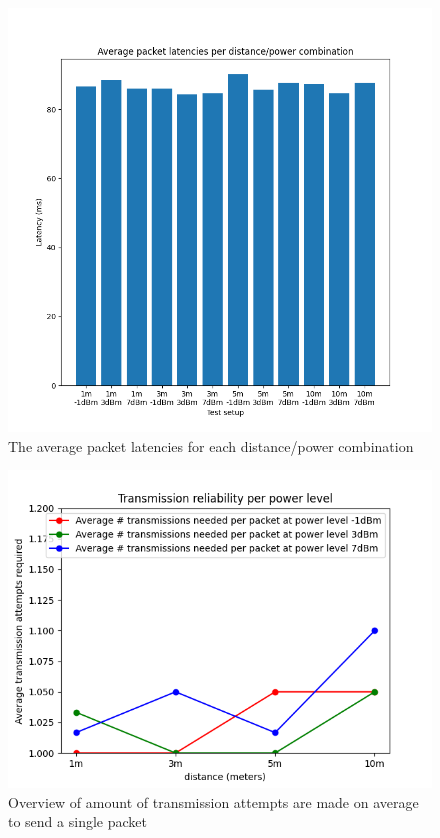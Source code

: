 \documentclass[conference]{IEEEtran}
\begin{document}
\begin{figure}[]
	\centering
	\includegraphics[width=\textwidth,keepaspectratio]{average_latencies.png}
	\caption{The average packet latencies for each distance/power combination}
	\label{fig:averagelatencies}
\end{figure}
\begin{figure}[]
	\centering
	\includegraphics[width=\textwidth,keepaspectratio]{transmission_reliability.png}
	\caption{Overview of amount of transmission attempts are made on average to send a single packet}
	\label{fig:txattempts}
\end{figure}
\end{document}
